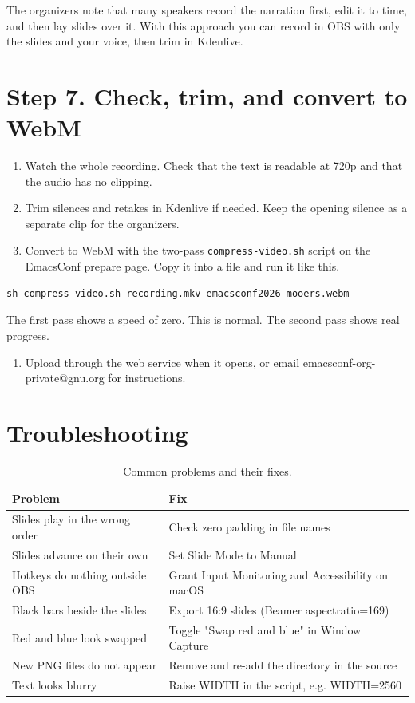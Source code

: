 \documentclass[11pt]{article}
\begin{document}
The organizers note that many speakers record the narration first, edit it to time, and then lay slides over it. With this approach you can record in OBS with only the slides and your voice, then trim in Kdenlive.
\section*{Step 7. Check, trim, and convert to WebM}
\label{sec:org37b20cc}

\begin{enumerate}
\item Watch the whole recording. Check that the text is readable at 720p and that the audio has no clipping.
\item Trim silences and retakes in Kdenlive if needed. Keep the opening silence as a separate clip for the organizers.
\item Convert to WebM with the two-pass \texttt{compress-video.sh} script on the EmacsConf prepare page. Copy it into a file and run it like this.
\end{enumerate}

\begin{verbatim}
sh compress-video.sh recording.mkv emacsconf2026-mooers.webm
\end{verbatim}

The first pass shows a speed of zero. This is normal. The second pass shows real progress.

\begin{enumerate}
\item Upload through the web service when it opens, or email emacsconf-org-private@gnu.org for instructions.
\end{enumerate}
\section*{Troubleshooting}
\label{sec:orgc269544}

\begin{table}[htbp]
\caption{Common problems and their fixes.}
\centering
\begin{tabular}{ll}
\toprule
Problem & Fix\\
\midrule
Slides play in the wrong order & Check zero padding in file names\\
Slides advance on their own & Set Slide Mode to Manual\\
Hotkeys do nothing outside OBS & Grant Input Monitoring and Accessibility on macOS\\
Black bars beside the slides & Export 16:9 slides (Beamer aspectratio=169)\\
Red and blue look swapped & Toggle "Swap red and blue" in Window Capture\\
New PNG files do not appear & Remove and re-add the directory in the source\\
Text looks blurry & Raise WIDTH in the script, e.g. WIDTH=2560\\
\bottomrule
\end{tabular}
\end{table}
\end{document}
